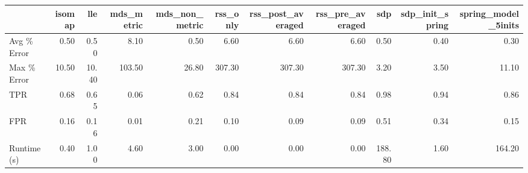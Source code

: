 \documentclass[preview]{standalone}
\begin{document}
    \begin{tabular}{lrrrrrrrrrr}
\toprule
{} &  isomap &    lle &  mds\_metric &  mds\_non\_metric &  rss\_only &  rss\_post\_averaged &  rss\_pre\_averaged &     sdp &  sdp\_init\_spring &  spring\_model\_5inits \\
\midrule
Avg \% Error &    0.50 &   0.50 &        8.10 &            0.50 &      6.60 &               6.60 &              6.60 &    0.50 &             0.40 &                 0.30 \\
Max \% Error &   10.50 &  10.40 &      103.50 &           26.80 &    307.30 &             307.30 &            307.30 &    3.20 &             3.50 &                11.10 \\
TPR         &    0.68 &   0.65 &        0.06 &            0.62 &      0.84 &               0.84 &              0.84 &    0.98 &             0.94 &                 0.86 \\
FPR         &    0.16 &   0.16 &        0.01 &            0.21 &      0.10 &               0.09 &              0.09 &    0.51 &             0.34 &                 0.15 \\
Runtime (s) &    0.40 &   1.00 &        4.60 &            3.00 &      0.00 &               0.00 &              0.00 &  188.80 &             1.60 &               164.20 \\
\bottomrule
\end{tabular}

    
\end{document}
